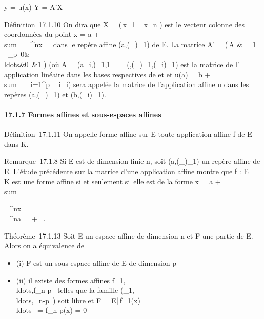 \documentclass[]{article}
\begin{document}
y = u(x) \Leftrightarrow Y = A'X

Définition~17.1.10 On dira que X = \left
(\matrix\,x\_1
\cr \⋮~
\cr x\_n 
\right ) est le vecteur colonne des coordonnées du
point x = a + \\sum ~
\_^nx\_\jmath\vece\_\jmath dans
le repère affine
(a,(\vece\_\jmath)\_1\leq\jmath\leqn) de E. La
matrice A' = \left
(\matrix\,A
&\matrix\,\alpha~\_1
\cr \⋮~
\cr \alpha~\_p \cr
\matrix\,0&\\ldots&0~&1
\right ) (où A = (a\_i,\jmath)\_1\leqi\leqp,1\leq\jmath\leqn
= \mathrmMat~
(\vecu,(\vece\_\jmath)\_1\leq\jmath\leqn,(\vecf\_i)\_1\leqi\leqp)
est la matrice de l' application linéaire \vecu dans
les bases respectives de \overrightarrowE et
\overrightarrowF et u(a) = b
+ \\sum ~
\_i=1^p\alpha~\_i\vecf\_i)
sera appelée la matrice de l'application affine u dans les repères
(a,(\vece\_\jmath)\_1\leq\jmath\leqn) et
(b,(\vecf\_i)\_1\leqi\leqp).

\paragraph{17.1.7 Formes affines et sous-espaces affines}

Définition~17.1.11 On appelle forme affine sur E toute application
affine f de E dans K.

Remarque~17.1.8 Si E est de dimension finie n, soit
(a,(\vece\_\jmath)\_1\leq\jmath\leqn) un repère
affine de E. L'étude précédente sur la matrice d'une application affine
montre que f : E \rightarrow~ K est une forme affine si et seulement si~elle est de
la forme x = a +\ \\sum

\_^nx\_\jmath\vece\_\jmath\mapsto~\\\sum
 \_^na\_\jmathx\_\jmath + \alpha~.

Théorème~17.1.13 Soit E un espace affine de dimension n et F une partie
de E. Alors on a équivalence de

\begin{itemize}
\itemsep1pt\parskip0pt
\item
  (i) F est un sous-espace affine de E de dimension p
\item
  (ii) il existe des formes affines
  f\_1,\\ldots,f\_n-p~
  telles que la famille
  (\vecf\_1,\\ldots,\vecf\_n-p~)
  soit libre et F = \x \in
  E∣f\_1(x) =
  \\ldots~ =
  f\_n-p(x) = 0\.
\end{itemize}
\end{document}
